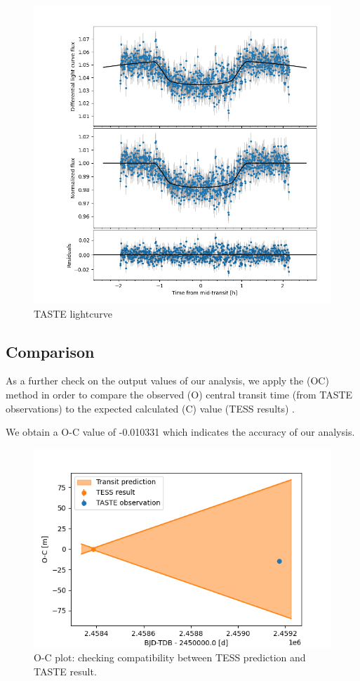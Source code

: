 \documentclass[a4paper,11pt,twocolumn]{article}
\begin{document}
\begin{figure}
  \centering
    \includegraphics[scale=0.3, angle=0]{../pictures/taste/lctaste.png}
    \caption{TASTE lightcurve}
   \label{fig: lc2}
\end{figure}




\subsection{Comparison}

As a further check on the output values of our analysis, we apply 
the (OC) method in order to compare the observed (O)
central transit time (from TASTE observations) to the expected calculated (C) value (TESS results) .

We obtain a O-C value of -0.010331 which indicates the accuracy of our analysis.

\begin{figure}
  \centering
    \includegraphics[scale=0.4, angle=0]{../pictures/comparison/oc.png}
    \caption{O-C plot: checking compatibility between TESS prediction and TASTE result.}
    \label{fig:ocplot}
\end{figure}
\end{document}
